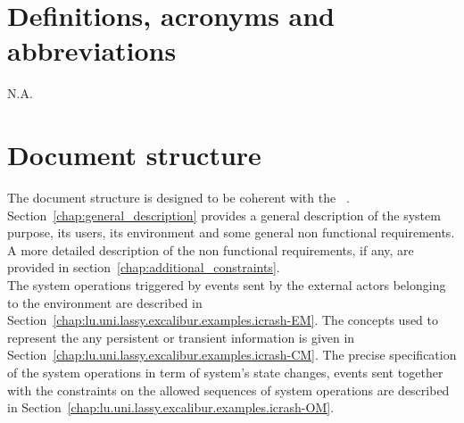 \section{Definitions, acronyms and abbreviations}

N.A.

\section{Document structure}
The document structure is designed to be coherent with the \msrmessirmeth~\cite{messirbook}. Section~\ref{chap:general_description} provides a general description of the system purpose, its users, its environment and some general non functional requirements. A more detailed description of the non functional requirements, if any, are provided in section~\ref{chap:additional_constraints}.\\
The \glspl{system operation} triggered by events sent by the external \glspl{actor}  belonging to the environment are described in Section~\ref{chap:lu.uni.lassy.excalibur.examples.icrash-EM}. The \msricrash concepts used to represent the any persistent or transient information is given in Section~\ref{chap:lu.uni.lassy.excalibur.examples.icrash-CM}. The precise specification of the system operations in term of system's state changes, events sent together with the constraints on the allowed sequences of system operations are described in Section~\ref{chap:lu.uni.lassy.excalibur.examples.icrash-OM}.
